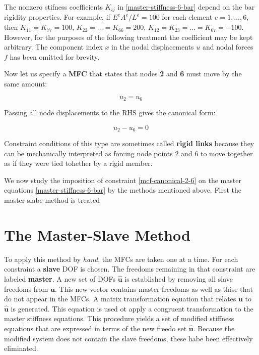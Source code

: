 \documentclass[10pt,b5paper,titlepage]{book}
\begin{document}
The nonzero stifness coefficients $ K_{ij} $ in \eqref{master-stiffness-6-bar}
depend on the bar rigidity properties. For example, if
$ E^e A^e / L^e = 100 $ for each element $ e = 1, \dots , 6 $, then
$ K_{11} = K_{77} = 100 $, $ K_{22} = \dots = K_{66} = 200 $,
$ K_{12} = K_{23} = \dots = K_{67} = -100 $. However, for the purposes of the
following treatment the coefficient may be kept arbitrary. The component index
$ x $ in the nodal displacements $ u $ and nodal forces $ f $ has been omitted
for brevity.

Now let us specify a \textbf{MFC} that states that nodes \textbf{2} and \textbf{6}
must move by the same amount:

\begin{equation}\label{mfc-2-6}
    u_2 = u_6
\end{equation}

Passing all node displacements to the RHS gives the canonical form:

\begin{equation}\label{mcf-canonical-2-6}
    u_2 - u_6 = 0
\end{equation}

Constraint conditions of this type are sometimes called \textbf{rigid links}
because they can be mechanically interpreted as forcing node points 2 and 6
to move together as if they were tied tohether by a rigid member.

We now study the imposition of constraint \eqref{mcf-canonical-2-6} on the master equations
\eqref{master-stiffness-6-bar} by the methods mentioned above. First the master-slabe
method is treated

\section{The Master-Slave Method}

To apply this method by \textit{hand}, the MFCs are taken one at a time. For each
constraint a \textbf{slave} DOF is chosen. The freedoms remaining in that constraint
are labeled \textbf{master}. A new set of DOFs $ \mathbf{\hat{u}} $ is established
by removing all slave freedoms from $ \mathbf{u} $. This new vector contains
master freedoms as well as thise that do not appear in the MFCs. A matrix transformation
equation that relates $ \mathbf{u} $ to $ \mathbf{\hat{u}} $ is generated. This
equation is used ot apply a congruent transformation to the master stiffness equations.
This procedure yields a set of modified stiffness equations that are expressed in terms
of the new freedo set $ \mathbf{\hat{u}} $. Because the modified system does not contain
the slave freedoms, these habe been effectively eliminated.
\end{document}
